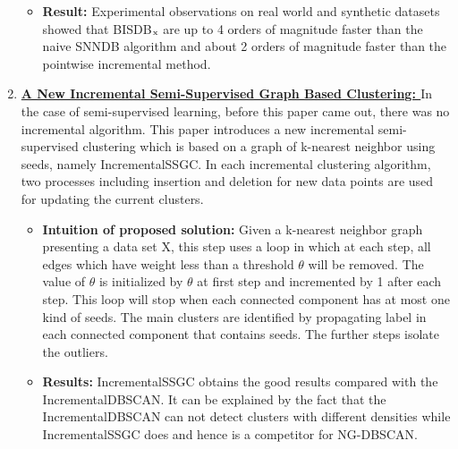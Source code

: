 \documentclass[acmsmall]{acmart}
\begin{document}
\begin{enumerate}
\begin{itemize}
        \item \textbf{Result:} Experimental observations on real world and synthetic datasets showed that BISDB$\textsubscript{x}$ are up to 4 orders of magnitude faster than the naive SNNDB algorithm and about 2 orders of magnitude faster than the pointwise incremental method.
    \end{itemize}
    \vspace{5pt}
    \item \textcolor{blue}{\textbf{\href{https://ieeexplore.ieee.org/document/8757475}{A New Incremental Semi-Supervised Graph Based Clustering: }}} \newline
     In the case of semi-supervised learning, before this paper came out, there was no incremental algorithm. This paper introduces a new incremental semi-supervised clustering which is based on a graph of k-nearest neighbor using seeds, namely IncrementalSSGC. In each incremental clustering algorithm, two processes including insertion and deletion for new data points are used for updating the current clusters.
    \begin{itemize}
        \item \textbf{Intuition of proposed solution:} Given a k-nearest neighbor graph presenting a data set X, this step uses a loop in which at each step, all edges which have weight less than a threshold $\theta$ will be removed. The value of $\theta$ is initialized by $\theta$ at first step and incremented by 1 after each step. This loop will stop when each connected component has at most one kind of seeds. The main clusters are identified by propagating label in each connected component that contains seeds. The further steps isolate the outliers.
        \item \textbf{Results:} IncrementalSSGC obtains the good results compared with the IncrementalDBSCAN. It can be explained by the fact that the IncrementalDBSCAN can not detect clusters with different densities while IncrementalSSGC does and hence is a competitor for NG-DBSCAN.
    \end{itemize}
\end{enumerate}
\vspace{1pt}
\end{document}

